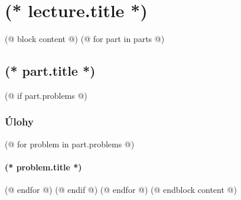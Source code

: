 \documentclass[12pt, twoside]{dgs}
\numberwithin{equation}{subsection}
\numberwithin{figure}{subsection}
\begin{document}
    \pagestyle{scholar}
    \section{(* lecture.title *)}
    
    (@ block content @)
        (@ for part in parts @)
            \subsection{\texorpdfstring{(* part.title *)}{(* part.pdftitle|default(part.title) *)}}
                
                (@ if part.problems @)
                    \subsubsection{Úlohy}
                    (@ for problem in part.problems @)
                        \paragraph{(* problem.title *)}
                        
                    (@ endfor @)
                (@ endif @)
        (@ endfor @)
    (@ endblock content @)
\end{document}

